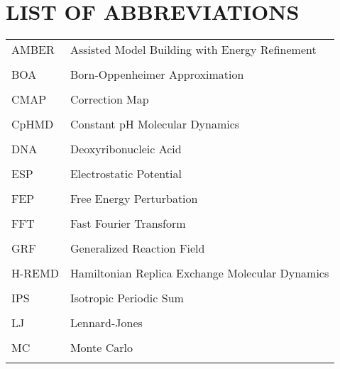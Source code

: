 
\chapter*{LIST OF ABBREVIATIONS}

\singlespacing

\begin{tabular}{lp{5in}}

AMBER & Assisted Model Building with Energy Refinement \\ \\

BOA & Born-Oppenheimer Approximation \\ \\

CMAP & Correction Map \\ \\ 

CpHMD & Constant pH Molecular Dynamics \\ \\

DNA & Deoxyribonucleic Acid \\ \\

ESP & Electrostatic Potential \\ \\

FEP & Free Energy Perturbation \\ \\

FFT & Fast Fourier Transform \\ \\

GRF & Generalized Reaction Field \\ \\

H-REMD & Hamiltonian Replica Exchange Molecular Dynamics \\ \\

IPS & Isotropic Periodic Sum \\ \\

LJ & Lennard-Jones \\ \\

MC & Monte Carlo \\ \\


\end{tabular}
